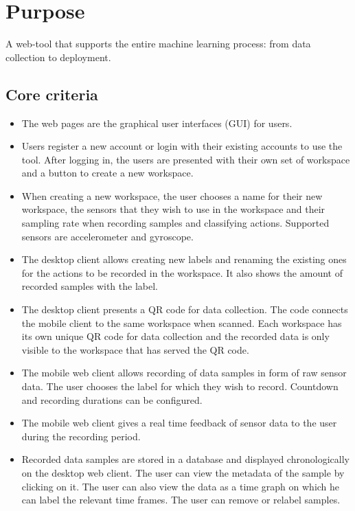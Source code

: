 \section{Purpose}
A web-tool that supports the entire machine learning process: from data collection to  deployment.

\subsection{Core criteria}
\begin{itemize}
    \item The web pages are the \glspl{graphical user interface} (GUI) for users.
    \item Users register a new account or login with their existing accounts to use the tool. After logging in, the users are presented with their own set of \gls{workspace} and a button to create a new \gls{workspace}.
    \item When creating a new \gls{workspace}, the user chooses a name for their new \gls{workspace}, the \glspl{sensor} that they wish to use in the \gls{workspace} and their sampling rate when recording samples and classifying actions. Supported \glspl{sensor} are \gls{accelerometer} and \gls{gyroscope}.
    \item The desktop client allows creating new labels and renaming the existing ones for the actions to be recorded in the \gls{workspace}. It also shows the amount of recorded samples with the label. 
    \item The desktop client presents a \gls{QR code} for data collection. The code connects the mobile client to the same \gls{workspace} when scanned. Each \gls{workspace} has its own unique \gls{QR code} for data collection and the recorded data is only visible to the \gls{workspace} that has served the \gls{QR code}.
    \item The mobile web client allows recording of \gls{data sample}s in form of raw \gls{sensor} data. The user chooses the \gls{label} for which they wish to record. Countdown and recording durations can be configured.
    \item The mobile web client gives a real time feedback of \gls{sensor} data to the user during the recording period.
    \item Recorded \gls{data sample}s are stored in a \gls{database} and displayed chronologically on the desktop web client. The user can view the \gls{metadata} of the sample by clicking on it. The user can also view the data as a time graph on which he can \gls{label} the relevant time frames. The user can remove or relabel samples.

\end{itemize}
